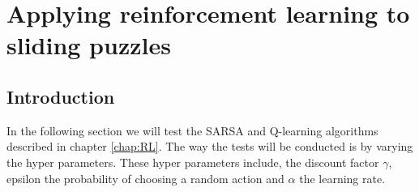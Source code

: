 \graphicspath{{Experiments\_and\_Results/fig}}

\chapter{Applying reinforcement learning to sliding puzzles}
\label{chap:Experiments_and_Results}
\section{Introduction}
In the following section we will test the SARSA and Q-learning algorithms described in chapter \ref{chap:RL}. The way the tests will be conducted is by varying the hyper parameters. These hyper parameters include, the discount factor $\gamma$, epsilon the probability of choosing a random action and $\alpha$ the learning rate.

